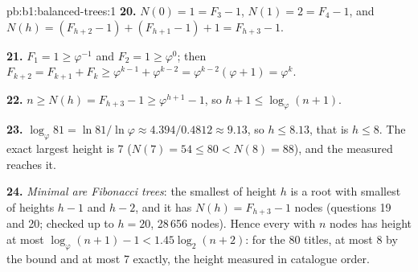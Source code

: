 \begin{solution}{pb:b1:balanced-trees:1}
\textbf{20.} $N(0) = 1 = F_3 - 1$, $N(1) = 2 = F_4 - 1$, and $N(h) = (F_{h+2} - 1) + (F_{h+1} - 1) + 1 = F_{h+3} - 1$.

\textbf{21.} $F_1 = 1 \geq \varphi^{-1}$ and $F_2 = 1 \geq \varphi^0$; then $F_{k+2} = F_{k+1} + F_k \geq \varphi^{k-1} +
\varphi^{k-2} = \varphi^{k-2}(\varphi + 1) = \varphi^k$.

\textbf{22.} $n \geq N(h) = F_{h+3} - 1 \geq \varphi^{h+1} - 1$, so $h + 1 \leq \log_\varphi (n + 1)$.

\textbf{23.} $\log_\varphi 81 = \ln 81 / \ln \varphi \approx 4.394/0.4812 \approx 9.13$, so $h \leq 8.13$, that is $h \leq
8$. The exact largest height is 7 ($N(7) = 54 \leq 80 < N(8) = 88$), and the measured  reaches it.

\textbf{24.} \emph{Minimal  are Fibonacci trees}: the smallest  of height $h$ is a root with smallest
 of heights $h - 1$ and $h - 2$, and it has $N(h) = F_{h+3} - 1$ nodes (questions 19 and 20; checked up to
$h = 20$, 28\,656 nodes). Hence every  with $n$ nodes has height at most $\log_\varphi (n + 1) - 1 < 1.45 \log_2
(n + 2)$: for the 80 titles, at most 8 by the bound and at most 7 exactly, the height measured in catalogue order.
\end{solution}
